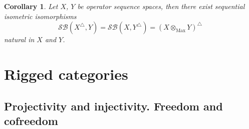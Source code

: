 \documentclass[12pt]{article}
\newtheorem{corollary}[theorem]{Corollary}
\begin{document}
\begin{corollary}\label{CorSQUnivPropMaxTenProd}
Let $X$, $Y$ be operator sequence spaces, then there exist sequential isometric isomorphisms
$$
\mathcal{SB}(X^\triangle, Y)=\mathcal{SB}(X,Y^\triangle)=(X\otimes_{\operatorname{Max}} Y)^\triangle
$$
natural in $X$ and $Y$. 
\end{corollary}































\section{Rigged categories}

\subsection{Projectivity and injectivity. Freedom and cofreedom}
\end{document}
